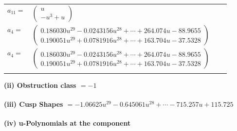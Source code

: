 \documentclass[1p]{elsarticle_modified}
\theoremstyle{definition}
\begin{document}
\begin{tabular}{m{7pt} m{180pt} m{7pt} m{180pt} }
\flushright $a_{11}=$&$\begin{pmatrix}u\\- u^3+u\end{pmatrix}$ \\
\flushright $a_{4}=$&$\begin{pmatrix}0.186030 u^{29}-0.0243156 u^{28}+\cdots+264.074 u-88.9655\\0.190051 u^{29}+0.0781916 u^{28}+\cdots+163.704 u-37.5328\end{pmatrix}$\\ \flushright $a_{4}=$&$\begin{pmatrix}0.186030 u^{29}-0.0243156 u^{28}+\cdots+264.074 u-88.9655\\0.190051 u^{29}+0.0781916 u^{28}+\cdots+163.704 u-37.5328\end{pmatrix}$\\&\end{tabular}
\flushleft \textbf{(ii) Obstruction class $= -1$}\\~\\
\flushleft \textbf{(iii) Cusp Shapes $= -1.06625 u^{29}-0.645061 u^{28}+\cdots-715.257 u+115.725$}\\~\\
\newpage\renewcommand{\arraystretch}{1}
\flushleft \textbf{(iv) u-Polynomials at the component}\newline \\
\end{document}
